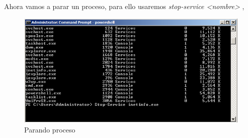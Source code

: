Ahora vamos a parar un proceso, para ello usaremos \textit{stop-service <nombre>} \cite{micro},

	\begin{figure}[H]
	\centering
	\includegraphics[scale=0.35]{pics/inet.png}  
	\caption{Parando proceso} \label{fig:inet}
\end{figure}


 






\grid
